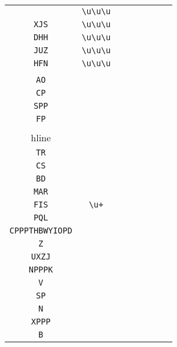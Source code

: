 \begin{longtable}{cccccccc}
\begin{tabular}{ll}
    \verb|KYB| & \verb|\u\u\u|\\
\verb|XJS| & \verb|\u\u\u|\\
\verb|DHH| & \verb|\u\u\u|\\
\verb|JUZ| & \verb|\u\u\u|\\
\verb|HFN| & \verb|\u\u\u|
\end{tabular}
\\\midrule 
\begin{tabular}{l}
    \verb|NP|\\
\verb|AO|\\
\verb|CP|\\
\verb|SPP|\\
\verb|FP|\\
\\hline\\
\verb|TR|\\
\verb|CS|\\
\verb|BD|\\
\verb|MAR|\\
\verb|FIS|
\end{tabular}

&
\verb|\u+|
&

\begin{tabular}{l}
    \verb|\u(P)*(\u)*|\\
\verb|PQL|\\
\verb|CPPPTHBWYIOPD|\\
\verb|Z|\\
\verb|UXZJ|\\
\verb|NPPPK|
\end{tabular}

&

\begin{tabular}{l}
    \verb|\u(P)*(\u)*|\\
\verb|V|\\
\verb|SP|\\
\verb|N|\\
\verb|XPPP|\\
\verb|B|
\end{tabular}

&


\end{longtable}
